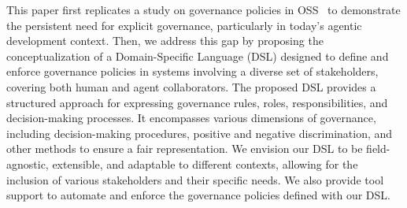 

This paper first replicates a study on governance policies in OSS~\cite{DBLP:conf/icse/IzquierdoC15} to demonstrate the persistent need for explicit governance, particularly in today's agentic development context.
Then, we address this gap by proposing the conceptualization of a Domain-Specific Language (DSL) designed to define and enforce governance policies in systems involving a diverse set of stakeholders, covering both human and agent collaborators. 
The proposed DSL provides a structured approach for expressing governance rules, roles, responsibilities, and decision-making processes.
It encompasses various dimensions of governance, including decision-making procedures, positive and negative discrimination, and other methods to ensure a fair representation.
We envision our DSL to be field-agnostic, extensible, and adaptable to different contexts, allowing for the inclusion of various stakeholders and their specific needs.
We also provide tool support to automate and enforce the governance policies defined with our DSL.

